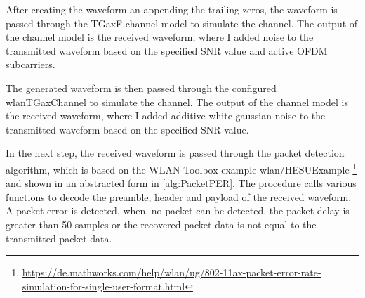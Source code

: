 After creating the waveform an appending the trailing zeros, the waveform is passed through the TGaxF channel model to simulate the channel.
The output of the channel model is the received waveform, where I added noise to the transmitted waveform based on the
specified \ac{SNR} value and active \ac{OFDM} subcarriers.

The generated waveform is then passed through the configured wlanTGaxChannel to simulate the channel.
The output of the channel model is the received waveform, where I added additive white gaussian noise to the transmitted waveform based on the specified \ac{SNR} value.

In the next step, the received waveform is passed through the packet detection algorithm, which is based on the
WLAN Toolbox example wlan/HESUExample \footnote{\url{https://de.mathworks.com/help/wlan/ug/802-11ax-packet-error-rate-simulation-for-single-user-format.html}} and
shown in an abstracted form in \autoref{alg:PacketPER}.
The procedure calls various functions to decode the preamble, header and payload of
the received waveform.
A packet error is detected, when, no packet can be detected, the packet delay is greater than \num{50} samples or the recovered packet data
is not equal to the transmitted packet data.

